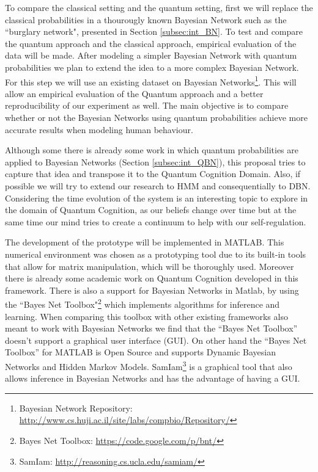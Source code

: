 \documentclass{llncs} %
\begin{document}
To compare the classical setting and the quantum setting, first we will replace the classical probabilities in a thourougly known Bayesian Network such as the ``burglary network"\cite{Pearl1988}, presented in Section \ref{subsec:int_BN}. To test and compare the quantum approach and the classical approach, empirical evaluation of the data will be made. After modeling a simpler Bayesian Network with quantum probabilities we plan to extend the idea to a more complex Bayesian Network. For this step we will use an existing dataset on Bayesian Networks\footnote{ Bayesian Network Repository: \url{http://www.cs.huji.ac.il/site/labs/compbio/Repository/}}. This will allow an empirical evaluation of the Quantum approach and a better reproducibility of our experiment as well. The main objective is to compare whether or not the Bayesian Networks using quantum probabilities achieve more accurate results when modeling human behaviour. 

Although some there is already some work in which quantum probabilities are applied to Bayesian Networks (Section \ref{subsec:int_QBN}), this proposal tries to capture that idea and transpose it to the Quantum Cognition Domain. Also, if possible we will try to extend our research to \ac{HMM} and consequentially to \ac{DBN}. Considering the time evolution of the system is an interesting topic to explore in the domain of Quantum Cognition, as our beliefs change over time but at the same time our mind tries to create a continuum to help with our self-regulation\cite{RefWorks:61}.

The development of the prototype will be implemented in MATLAB. This numerical environment was chosen as a prototyping tool due to its built-in tools that allow for matrix manipulation, which will be thoroughly used. Moreover there is already some academic work on Quantum Cognition developed in this framework\cite{Busemeyer2009423}\cite{Trueblood}\cite{Busemeyer2009}\cite{Busemeyer:2012:QMC:2385442}. There is also a support for Bayesian Networks in Matlab, by using the ``Bayes Net Toolbox"\footnote{Bayes Net Toolbox: \url{https://code.google.com/p/bnt/}} which implements algorithms for inference and learning. When comparing this toolbox with other existing frameworks also meant to work with Bayesian Networks we find that the ``Bayes Net Toolbox” doesn’t support a graphical user interface (GUI). On other hand the ``Bayes Net Toolbox” for MATLAB is Open Source and supports Dynamic Bayesian Networks and Hidden Markov Models. SamIam\footnote{ SamIam: \url{ http://reasoning.cs.ucla.edu/samiam/}} is a graphical tool that also allows inference in Bayesian Networks and has the advantage of having a GUI. 





%

%

\end{document}
